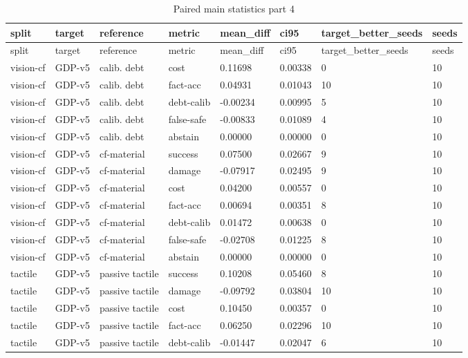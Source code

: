 \documentclass{article}
\begin{document}
\begin{center}
\tiny
\renewcommand{\arraystretch}{0.92}
\setlength{\tabcolsep}{3pt}
\begin{longtable}{llllllll}
\caption{Paired main statistics part 4}\label{tab:paired-main-statistics-4}\\
\toprule
split & target & reference & metric & mean\_diff & ci95 & target\_better\_seeds & seeds \\
\midrule
\endfirsthead
\toprule
split & target & reference & metric & mean\_diff & ci95 & target\_better\_seeds & seeds \\
\midrule
\endhead
vision-cf & GDP-v5 & calib. debt & cost & 0.11698 & 0.00338 & 0 & 10 \\
vision-cf & GDP-v5 & calib. debt & fact-acc & 0.04931 & 0.01043 & 10 & 10 \\
vision-cf & GDP-v5 & calib. debt & debt-calib & -0.00234 & 0.00995 & 5 & 10 \\
vision-cf & GDP-v5 & calib. debt & false-safe & -0.00833 & 0.01089 & 4 & 10 \\
vision-cf & GDP-v5 & calib. debt & abstain & 0.00000 & 0.00000 & 0 & 10 \\
vision-cf & GDP-v5 & cf-material & success & 0.07500 & 0.02667 & 9 & 10 \\
vision-cf & GDP-v5 & cf-material & damage & -0.07917 & 0.02495 & 9 & 10 \\
vision-cf & GDP-v5 & cf-material & cost & 0.04200 & 0.00557 & 0 & 10 \\
vision-cf & GDP-v5 & cf-material & fact-acc & 0.00694 & 0.00351 & 8 & 10 \\
vision-cf & GDP-v5 & cf-material & debt-calib & 0.01472 & 0.00638 & 0 & 10 \\
vision-cf & GDP-v5 & cf-material & false-safe & -0.02708 & 0.01225 & 8 & 10 \\
vision-cf & GDP-v5 & cf-material & abstain & 0.00000 & 0.00000 & 0 & 10 \\
tactile & GDP-v5 & passive tactile & success & 0.10208 & 0.05460 & 8 & 10 \\
tactile & GDP-v5 & passive tactile & damage & -0.09792 & 0.03804 & 10 & 10 \\
tactile & GDP-v5 & passive tactile & cost & 0.10450 & 0.00357 & 0 & 10 \\
tactile & GDP-v5 & passive tactile & fact-acc & 0.06250 & 0.02296 & 10 & 10 \\
tactile & GDP-v5 & passive tactile & debt-calib & -0.01447 & 0.02047 & 6 & 10 \\

\end{longtable}
\end{center}
\end{document}

